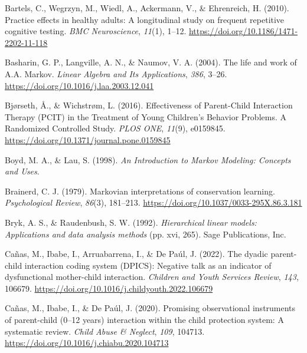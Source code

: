 \documentclass[12pt]{./styles/outhesis}
\begin{document}
\leavevmode{}%
Bartels, C., Wegrzyn, M., Wiedl, A., Ackermann, V., \& Ehrenreich, H.
(2010). Practice effects in healthy adults: {A} longitudinal study on
frequent repetitive cognitive testing. \emph{BMC Neuroscience},
\emph{11}(1), 1--12. \url{https://doi.org/10.1186/1471-2202-11-118}

\leavevmode{}%
Basharin, G. P., Langville, A. N., \& Naumov, V. A. (2004). The life and
work of {A}.{A}. {Markov}. \emph{Linear Algebra and Its Applications},
\emph{386}, 3--26. \url{https://doi.org/10.1016/j.laa.2003.12.041}

\leavevmode{}%
Bjørseth, Å., \& Wichstrøm, L. (2016). Effectiveness of {Parent-Child
Interaction Therapy} ({PCIT}) in the {Treatment} of {Young Children}'s
{Behavior Problems}. {A Randomized Controlled Study}. \emph{PLOS ONE},
\emph{11}(9), e0159845.
\url{https://doi.org/10.1371/journal.pone.0159845}

\leavevmode{}%
Boyd, M. A., \& Lau, S. (1998). \emph{An {Introduction} to {Markov
Modeling}: {Concepts} and {Uses}}.

\leavevmode{}%
Brainerd, C. J. (1979). Markovian interpretations of conservation
learning. \emph{Psychological Review}, \emph{86}(3), 181--213.
\url{https://doi.org/10.1037/0033-295X.86.3.181}

\leavevmode{}%
Bryk, A. S., \& Raudenbush, S. W. (1992). \emph{Hierarchical linear
models: {Applications} and data analysis methods} (pp. xvi, 265). Sage
Publications, Inc.

\leavevmode{}%
Cañas, M., Ibabe, I., Arruabarrena, I., \& De Paúl, J. (2022). The
dyadic parent-child interaction coding system ({DPICS}): {Negative} talk
as an indicator of dysfunctional mother-child interaction.
\emph{Children and Youth Services Review}, \emph{143}, 106679.
\url{https://doi.org/10.1016/j.childyouth.2022.106679}

\leavevmode{}%
Cañas, M., Ibabe, I., \& De Paúl, J. (2020). Promising observational
instruments of parent-child (0--12 years) interaction within the child
protection system: {A} systematic review. \emph{Child Abuse \& Neglect},
\emph{109}, 104713. \url{https://doi.org/10.1016/j.chiabu.2020.104713}
\end{document}
